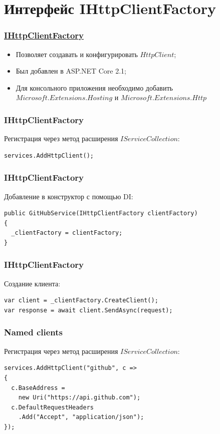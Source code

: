 \documentclass[17pt,aspectratio=169]{beamer}
\begin{document}
\section{Интерфейс IHttpClientFactory}
\begin{frame}
\frametitle{\href{https://docs.microsoft.com/en-us/dotnet/api/system.net.http.ihttpclientfactory?view=aspnetcore-2.2}{IHttpClientFactory}}
\begin{itemize}
	\item <1-> Позволяет создавать и конфигурировать $HttpClient$;
	\item <2-> Был добавлен в ASP.NET Core 2.1;
	\item <3-> Для консольного приложения необходимо добавить \href{https://www.nuget.org/packages/Microsoft.Extensions.Hosting}{$Microsoft.Extensions.Hosting$} и \href{https://www.nuget.org/packages/Microsoft.Extensions.Http}{$Microsoft.Extensions.Http$}
\end{itemize}
\end{frame}

\begin{frame}[fragile]
\frametitle{IHttpClientFactory}
Регистрация через метод расширения $IServiceCollection$:
\newline
\begin{lstlisting}
services.AddHttpClient();
\end{lstlisting}
\end{frame}

\begin{frame}[fragile]
\frametitle{IHttpClientFactory}
Добавление в конструктор с помощью DI:
\newline
\begin{lstlisting}
public GitHubService(IHttpClientFactory clientFactory)
{
  _clientFactory = clientFactory;
}
\end{lstlisting}
\end{frame}

\begin{frame}[fragile]
\frametitle{IHttpClientFactory}
Создание клиента:
\newline
\begin{lstlisting}
var client = _clientFactory.CreateClient();
var response = await client.SendAsync(request);
\end{lstlisting}
\end{frame}

\begin{frame}[fragile]
\frametitle{Named clients}
Регистрация через метод расширения $IServiceCollection$:
\newline
\begin{lstlisting}
services.AddHttpClient("github", c =>
{
  c.BaseAddress = 
    new Uri("https://api.github.com");
  c.DefaultRequestHeaders
    .Add("Accept", "application/json");
});
\end{lstlisting}
\end{frame}
\end{document}
